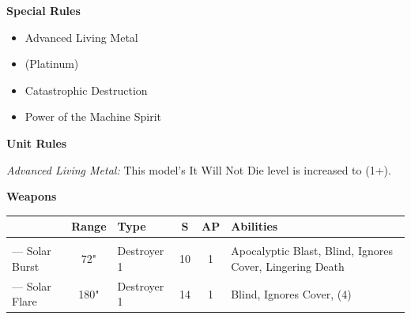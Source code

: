 \begin{minipage}[t]{0.72\textwidth}
\begin{minipage}[t]{0.5\textwidth}
\begin{flushleft}
			\textbf{Special Rules}
			\begin{itemize}
				\item Advanced Living Metal
				\item {} (Platinum)
				\item Catastrophic Destruction
				\item Power of the Machine Spirit
			\end{itemize}
		\end{flushleft}
	\end{minipage}
	
	\vspace*{2em}
	\textbf{Unit Rules}
	
	\textit{Advanced Living Metal:} This model's It Will Not Die level is increased to (1+).
	
	\vspace*{2em}
	\textbf{Weapons}
	
	\begin{tabular}{L{90 pt} c C{40pt} *{2}{c} >{\raggedright\arraybackslash}p{130pt}}
		& Range & Type & S & AP & Abilities \\
		\hline
		 & & & & & \\
		— Solar Burst & 72" & Destroyer 1 & 10 & 1 & Apocalyptic Blast, Blind, Ignores Cover, Lingering Death \\
		— Solar Flare & 180" & Destroyer 1 & 14 & 1 & Blind, Ignores Cover,  (4)\\
	\end{tabular}
\end{minipage}



\newpage
\subsubsection[Doomsday Monolith]{}


\newpage
\subsubsection[Gauss Pylon]{}


\newpage
\subsubsection[Sentry Pylon]{}


\newpage
\subsubsection[Obelisk]{}


